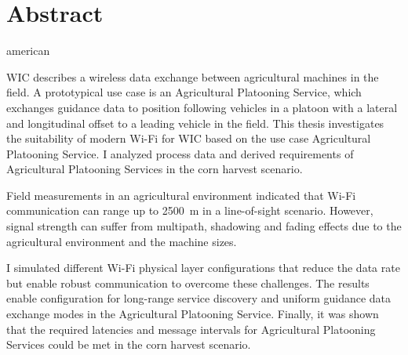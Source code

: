 \chapter*{Abstract}
\begin{otherlanguage*}{american}

\begin{comment}
    about 1/2 page:
\begin{enumerate}
    \item Motivation (Why do we care?)
    \item Problem statement (What problem are we trying to solve?)
    \item Approach (How did we go about it)
    \item Results (What's the answer?)
    \item Conclusion (What are the implications of the answer?)
\end{enumerate}

The abstract is a miniature version of the thesis.
It should be treated as an entirely separate document.
Do not assume that a reader who has access to an abstract will also have access to the thesis.
Do not assume that a reader who reads the thesis has read the abstract.

\end{comment}

\ac{WIC} describes a wireless data exchange between agricultural machines in the field.
A prototypical use case is an Agricultural Platooning Service, which exchanges guidance data to position following
vehicles in a platoon with a lateral and longitudinal offset to a leading vehicle in the field.
This thesis investigates the suitability of modern Wi-Fi for \ac{WIC} based on the use case Agricultural Platooning Service.
I analyzed process data and derived requirements of Agricultural Platooning Services in the corn harvest scenario.

Field measurements in an agricultural environment indicated that Wi-Fi communication can range up to \SI{2500}{\metre} in
a line-of-sight scenario.
However, signal strength can suffer from multipath, shadowing and fading effects due to the
agricultural environment and the machine sizes.


I simulated different Wi-Fi physical layer configurations that reduce the data rate but
enable robust communication to overcome these challenges.
The results enable configuration for long-range service discovery and uniform guidance data exchange modes
in the Agricultural Platooning Service.
Finally, it was shown that the required latencies and message intervals for Agricultural Platooning Services could be met in the corn harvest
scenario.

\end{otherlanguage*}

